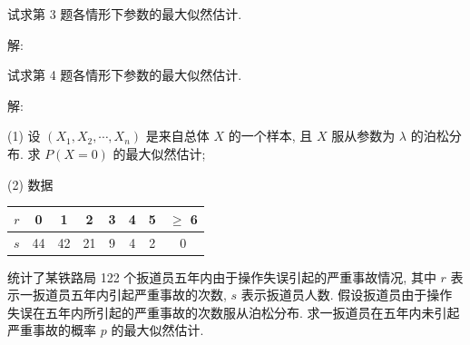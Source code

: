 \documentclass[standard]{ExBook}
\begin{document}
\begin{qitems}
    \begin{bbox}
    \begin{shaded}
        \qitem
试求第 3 题各情形下参数的最大似然估计.
    \end{shaded}
    \end{bbox}

\vspace{-5em}

    \begin{bbox}
解: 
    \end{bbox}

\vspace{-5em}

    \begin{bbox}
    \begin{shaded}
        \qitem
试求第 4 题各情形下参数的最大似然估计.
    \end{shaded}
    \end{bbox}

\vspace{-5em}

    \begin{bbox}
解: 
    \end{bbox}

\vspace{-5em}

    \begin{bbox}
    \begin{shaded}
        \qitem

(1) 设 \( (X_1, X_2, \cdots, X_n) \) 是来自总体 \( X \) 的一个样本, 且 \( X \) 服从参数为 \( \lambda \) 的泊松分布. 求 \( P(X = 0) \) 的最大似然估计;

(2) 数据

\begin{center}
\setlength{\tabcolsep}{26pt}
\begin{tabular}{c|ccccccc}
\hline  
\( r \) & 0 & 1 & 2 & 3 & 4 & 5 & \(\geq\) 6 \\
\hline
\( s \) & 44 & 42 & 21 & 9 & 4 & 2 & 0 \\
\hline
\end{tabular}
\end{center}

统计了某铁路局 122 个扳道员五年内由于操作失误引起的严重事故情况, 其中 \( r \) 表示一扳道员五年内引起严重事故的次数, \( s \) 表示扳道员人数. 假设扳道员由于操作失误在五年内所引起的严重事故的次数服从泊松分布. 求一扳道员在五年内未引起严重事故的概率 \( p \) 的最大似然估计.
    \end{shaded}
    \end{bbox}


\end{qitems}
\end{document}
